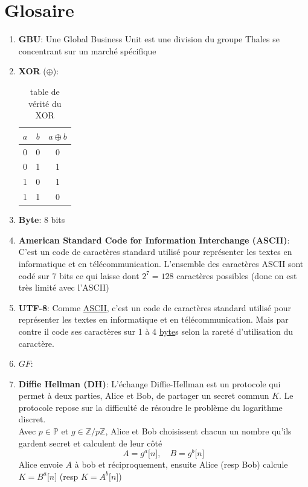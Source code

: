 \documentclass[a4paper, 12pt]{article}
\begin{document}
\section*{Glosaire}
\begin{enumerate}
\item \textbf{GBU}\label{GBU}: Une Global Business Unit est une division du groupe Thales se concentrant sur un marché spécifique
\item \textbf{XOR}\label{XOR} ($\oplus$):\\
	\begin{table}[h]
	\center
	\begin{tabular}{|c|c|c|}
	\hline
		$a$ & $b$ & $a\oplus b$ \\ \hline\hline
		0 & 0 & 0 \\ \hline
		0 & 1 & 1 \\ \hline
		1 & 0 & 1 \\ \hline
		1 & 1 & 0 \\ \hline
	\end{tabular}
	\caption{table de vérité du XOR}
	\label{XOR_table}
	\end{table}
\item \textbf{Byte}\label{byte}: 8 bits	
\item \textbf{American Standard Code for Information Interchange (ASCII)}\label{ASCII}: C'est un code de caractères standard utilisé pour représenter les textes en informatique et en télécommunication. L'ensemble des caractères ASCII sont codé sur 7 bits ce qui laisse dont $2^7 = 128$ caractères possibles (donc on est très limité avec l'ASCII)
\item \textbf{UTF-8}\label{utf}: Comme \hyperref[ASCII]{ASCII}, c'est un code de caractères standard utilisé pour représenter les textes en informatique et en télécommunication. Mais par contre il code ses caractères sur 1 à 4 \hyperref[byte]{byte}s selon la rareté d'utilisation du caractère. 
\item $GF$\label{GF}: 
\item \textbf{Diffie Hellman (DH)}\label{DH}: L'échange Diffie-Hellman est un protocole qui permet à deux parties, Alice et Bob, de partager un secret commun $K$. Le protocole repose sur la difficulté de résoudre le problème du logarithme discret. \\

\noindent Avec $p \in \mathbb{P}$ et $g\in \mathbb{Z}/p\mathbb{Z}$, Alice et Bob choisissent chacun un nombre qu'ils gardent secret et calculent de leur côté 
$$
A = g^a \lbrack n \rbrack, \quad B = g^b \lbrack n \rbrack 
$$
Alice envoie $A$ à bob et réciproquement, ensuite Alice (resp Bob) calcule $K = B^a \lbrack n \rbrack$ (resp $K = A^b \lbrack n \rbrack$) \\


\end{enumerate}
\end{document}

